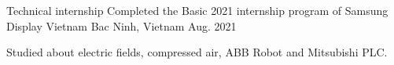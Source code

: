 

\begin{cventries}

  \cventry
    {Technical internship} %
    {Completed the Basic 2021 internship program of Samsung Display Vietnam} %
    {Bac Ninh, Vietnam} %
    {Aug. 2021} %
    {
      \begin{cvitems} %
        \item {Studied about electric fields, compressed air, ABB Robot and Mitsubishi PLC.}
      \end{cvitems}
    }

\end{cventries}
